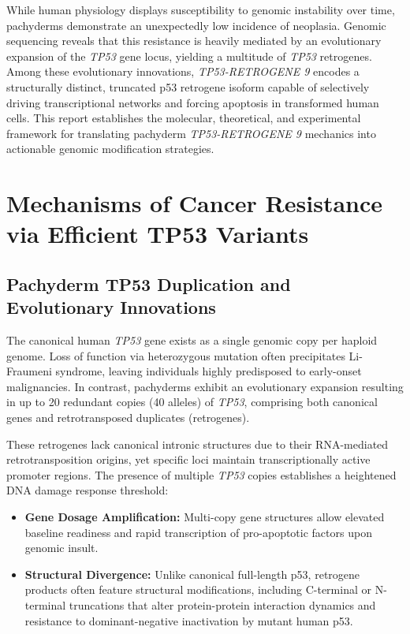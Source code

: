 \documentclass[12pt]{article}
\begin{document}
While human physiology displays susceptibility to genomic instability over time, pachyderms demonstrate an unexpectedly low incidence of neoplasia. Genomic sequencing reveals that this resistance is heavily mediated by an evolutionary expansion of the \textit{TP53} gene locus, yielding a multitude of \textit{TP53} retrogenes. Among these evolutionary innovations, \textit{TP53-RETROGENE 9} encodes a structurally distinct, truncated p53 retrogene isoform capable of selectively driving transcriptional networks and forcing apoptosis in transformed human cells. This report establishes the molecular, theoretical, and experimental framework for translating pachyderm \textit{TP53-RETROGENE 9} mechanics into actionable genomic modification strategies.

\section{Mechanisms of Cancer Resistance via Efficient TP53 Variants}

\subsection{Pachyderm TP53 Duplication and Evolutionary Innovations}

The canonical human \textit{TP53} gene exists as a single genomic copy per haploid genome. Loss of function via heterozygous mutation often precipitates Li-Fraumeni syndrome, leaving individuals highly predisposed to early-onset malignancies. In contrast, pachyderms exhibit an evolutionary expansion resulting in up to 20 redundant copies (40 alleles) of \textit{TP53}, comprising both canonical genes and retrotransposed duplicates (retrogenes).

These retrogenes lack canonical intronic structures due to their RNA-mediated retrotransposition origins, yet specific loci maintain transcriptionally active promoter regions. The presence of multiple \textit{TP53} copies establishes a heightened DNA damage response threshold:
\begin{itemize}
    \item \textbf{Gene Dosage Amplification:} Multi-copy gene structures allow elevated baseline readiness and rapid transcription of pro-apoptotic factors upon genomic insult.
    \item \textbf{Structural Divergence:} Unlike canonical full-length p53, retrogene products often feature structural modifications, including C-terminal or N-terminal truncations that alter protein-protein interaction dynamics and resistance to dominant-negative inactivation by mutant human p53.
\end{itemize}
\end{document}
